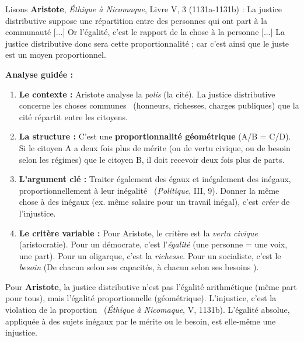 \documentclass[11pt]{article}
\newcommand{\cle}[1]{{\popxbold\color{popdark}#1}}
\begin{document}
\begin{experience}
Lisons \textbf{Aristote}, \emph{Éthique à Nicomaque}, Livre V, 3 (1131a-1131b) :
\guillemotleft La justice distributive suppose une répartition entre des personnes qui ont part à la communauté [...] Or l'égalité, c'est le rapport de la chose à la personne [...] La justice distributive donc sera cette proportionnalité ; car c'est ainsi que le juste est un moyen proportionnel. \guillemotright

\medskip
\textbf{Analyse guidée :}
\begin{enumerate}
    \item \textbf{Le contexte :} Aristote analyse la \emph{polis} (la cité). La justice distributive concerne les \guillemotleft choses communes \guillemotright\ (honneurs, richesses, charges publiques) que la cité répartit entre les citoyens.
    \item \textbf{La structure :} C'est une \textbf{proportionnalité géométrique} (A/B = C/D). Si le citoyen A a deux fois plus de mérite (ou de vertu civique, ou de besoin selon les régimes) que le citoyen B, il doit recevoir deux fois plus de parts.
    \item \textbf{L'argument clé :} \guillemotleft Traiter également des égaux et inégalement des inégaux, proportionnellement à leur inégalité \guillemotright\ (\emph{Politique}, III, 9). Donner la même chose à des inégaux (ex. même salaire pour un travail inégal), c'est \emph{créer} de l'injustice.
    \item \textbf{Le critère variable :} Pour Aristote, le critère est la \emph{vertu civique} (aristocratie). Pour un démocrate, c'est l'\emph{égalité} (une personne = une voix, une part). Pour un oligarque, c'est la \emph{richesse}. Pour un socialiste, c'est le \emph{besoin} (\guillemotleft De chacun selon ses capacités, à chacun selon ses besoins \guillemotright).
\end{enumerate}
\end{experience}

\begin{propriete}
Pour \textbf{Aristote}, la justice distributive n'est pas l'égalité arithmétique (même part pour tous), mais l'\cle{égalité proportionnelle} (géométrique). \guillemotleft L'injustice, c'est la violation de la proportion \guillemotright\ (\emph{Éthique à Nicomaque}, V, 1131b). L'égalité absolue, appliquée à des sujets inégaux par le mérite ou le besoin, est elle-même une injustice.
\end{propriete}
\end{document}
